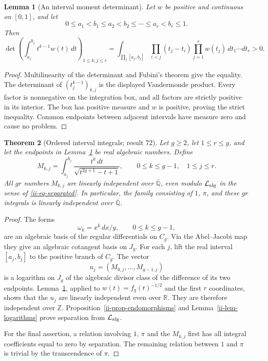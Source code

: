 \documentclass[11pt,a4paper]{article}
\newtheorem{theorem}{Theorem}[section]
\newtheorem{lemma}[theorem]{Lemma}
\theoremstyle{definition}
\theoremstyle{remark}
\numberwithin{equation}{section}
\newcommand{\Qbar}{\overline{\mathbb Q}}
\begin{document}
\begin{lemma}[An interval moment determinant]
\label{ii-lem-vandermonde}
Let $w$ be positive and continuous on $[0,1]$, and let
\[
 0\le a_1<b_1\le a_2<b_2\le\cdots\le a_r<b_r\le1.
\]
Then
\begin{equation}\label{ii-eq-vandermonde}
 \det\left(\int_{a_j}^{b_j} t^{k-1}w(t)\,dt\right)_{1\le k,j\le r}
 =\int_{\prod_j[a_j,b_j]}
   \prod_{i<j}(t_j-t_i)\prod_{j=1}^r w(t_j)\,
   dt_1\cdots dt_r>0.
\end{equation}
\end{lemma}
\begin{proof}
Multilinearity of the determinant and Fubini's theorem give the equality.
The determinant of $(t_j^{k-1})_{k,j}$ is the displayed Vandermonde
product.  Every factor is nonnegative on the integration box, and all
factors are strictly positive in its interior.  The box has positive
measure and $w$ is positive, proving the strict inequality.  Common
endpoints between adjacent intervals have measure zero and cause no
problem.
\end{proof}

\begin{theorem}[Ordered interval integrals; result 72]
\label{ii-thm-intervals}
Let $g\ge2$, let $1\le r\le g$, and let the endpoints in
Lemma~\ref{ii-lem-vandermonde} be real algebraic numbers.  Define
\begin{equation}\label{ii-eq-block-integrals}
 M_{k,j}=\int_{a_j}^{b_j}
             \frac{t^k\,dt}{\sqrt{t^{2g+1}-t+1}},
 \qquad 0\le k\le g-1,\quad1\le j\le r.
\end{equation}
All $gr$ numbers $M_{k,j}$ are linearly independent over $\Qbar$,
even modulo $\mathcal L_{\rm alg}$ in the sense of
\eqref{ii-eq-separated}.  In particular, the family consisting of
$1$, $\pi$, and these $gr$ integrals is linearly independent over
$\Qbar$.
\end{theorem}
\begin{proof}
The forms
\[
 \omega_k=x^k\,dx/y,\qquad0\le k\le g-1,
\]
are an algebraic basis of the regular differentials on $C_g$.  Via the
Abel--Jacobi map they give an algebraic cotangent basis on $J_g$.
For each $j$, lift the real interval $[a_j,b_j]$ to the positive branch of
$C_g$.  The vector
\[
 u_j=(M_{0,j},\ldots,M_{g-1,j})
\]
is a logarithm on $J_g$ of the algebraic divisor class of the difference
of its two endpoints.  Lemma~\ref{ii-lem-vandermonde}, applied to
$w(t)=f_g(t)^{-1/2}$ and the first $r$ coordinates, shows that the $u_j$
are linearly independent even over $\mathbb R$.  They are therefore
independent over $\mathbb Z$.  Proposition~\ref{ii-prop-endomorphisms}
and Lemma~\ref{ii-lem-logarithms} prove separation from
$\mathcal L_{\rm alg}$.

For the final assertion, a relation involving $1$, $\pi$ and the $M_{k,j}$
first has all integral coefficients equal to zero by separation.  The
remaining relation between $1$ and $\pi$ is trivial by the transcendence
of $\pi$.
\end{proof}
\end{document}
